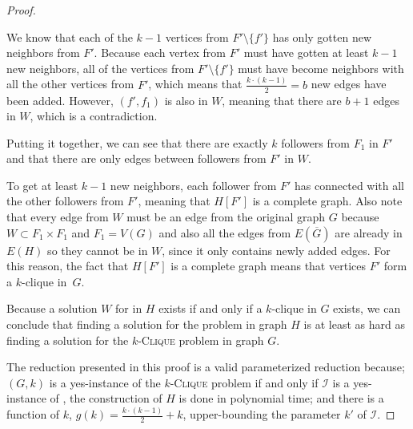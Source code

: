 \begin{proof}
\begin{subproof}
        We know that each of the $k-1$ vertices from $F' \setminus \{f'\}$ has only gotten new neighbors from $F'$.
        Because each vertex from $F'$ must have gotten at least $k-1$ new neighbors,
        all of the vertices from $F' \setminus \{f'\}$ must have become neighbors with all the other vertices from $F'$,
        which means that $\frac{k \cdot (k-1)}{2} = b$ new edges have been added.
        However, $(f',f_1)$ is also in $W$, meaning that there are $b+1$ edges in $W$, which is a contradiction.
    \end{subproof}

    Putting it together, we can see that there are exactly $k$ followers from $F_1$ in $F'$
    and that there are only edges between followers from $F'$ in $W$.
    
    To get at least $k-1$ new neighbors, each follower from $F'$ has connected with all the other
    followers from $F'$, meaning that $H[F']$ is a complete graph.
    Also note that every edge from $W$ must be an edge from the original graph $G$ because $W \subset F_1 \times F_1$ and $F_1 = V(G)$
    and also all the edges from $E(\overline{G})$ are already in $E(H)$ so they cannot be in $W$, since it only contains newly added edges.
    For this reason, the fact that $H[F']$ is a complete graph means that vertices $F'$ form a $k$-clique in~$G$.

    Because a solution $W$ for \HLshort in $H$ exists if and only if a $k$-clique in $G$ exists,
    we can conclude that finding a solution for the \HL problem in graph $H$ is at least as hard as
    finding a solution for the $k$-\textsc{Clique} problem in graph $G$.

    The reduction presented in this proof is a valid parameterized reduction because;
    $(G, k)$ is a yes-instance of the $k$-\textsc{Clique} problem if and only if $\mathcal{I}$ is a yes-instance of \HLdeg,
    the construction of $H$ is done in polynomial time;
    and there is a function of $k$, $g(k) = \frac{k\cdot(k-1)}{2} + k$, upper-bounding the parameter $k'$ of $\mathcal{I}$.
\end{proof}

